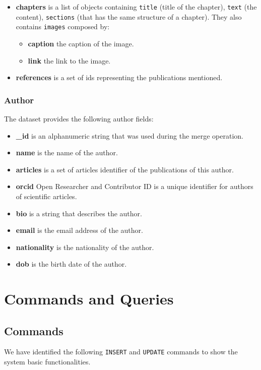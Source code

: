 \documentclass{Configuration_Files/PoliMi3i_thesis}
\begin{document}
\begin{itemize}
\begin{itemize}
				\end{itemize}
\item \textbf{chapters} is a list of objects containing \verb |title| (title of the chapter), \verb |text| (the content),
	 \verb |sections| (that has the same structure of a chapter). They also contains \verb |images| composed by:
				\begin{itemize}
					\item \textbf{caption} the caption of the image.
					\item \textbf{link} the link to the image.
				\end{itemize}
\item \textbf{references} is a set of ids representing the publications mentioned.
\end{itemize}
\bigskip

\subsection{Author}
The dataset provides the following author fields:
\begin{itemize}
\item \textbf{\_id} is an alphanumeric string that was used during the merge operation.
\item \textbf{name} is the name of the author.
\item \textbf{articles} is a set of articles identifier of the publications of this author.
\item \textbf{orcid} Open Researcher and Contributor ID is a unique identifier for authors of scientific articles.
\item \textbf{bio} is a string that describes the author.
\item \textbf{email} is the email address of the author.
\item \textbf{nationality} is the nationality of the author.
\item \textbf{dob} is the birth date of the author.
\end{itemize}


\chapter{Commands and Queries}
\label{ch:ceq}
\section{Commands}
We have identified the following \verb |INSERT| and \verb |UPDATE| commands to show the system basic functionalities.
\end{document}
